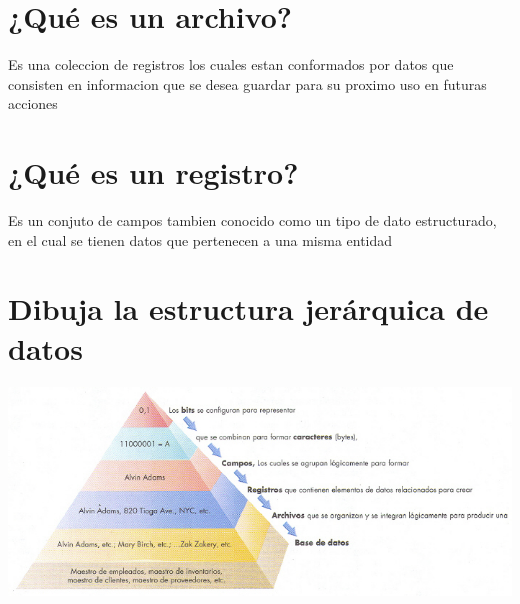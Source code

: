 \documentclass{article}
\begin{document}
\section{¿Qué es un archivo?}
    Es una coleccion de registros los cuales estan conformados por datos que consisten en informacion que se desea guardar para su proximo uso en futuras acciones

\section{¿Qué es un registro?}
    Es un conjuto de campos tambien conocido como un tipo de dato estructurado, en el cual se tienen datos que pertenecen a una misma entidad

\section{Dibuja la estructura jerárquica de datos}
\begin{center}
\includegraphics[width= 15cm]{./Estructura.jpg}
\end{center}

\end{document}
